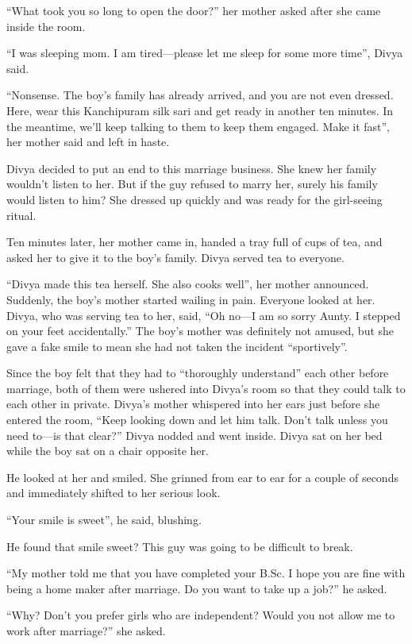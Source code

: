 “What took you so long to open the door?” her mother asked after she came inside
the room.

“I was sleeping mom. I am tired—please let me sleep for some more time”, Divya
said.

“Nonsense. The boy's family has already arrived, and you are not even dressed. Here,
wear this Kanchipuram silk sari and get ready in another ten minutes. In the
meantime, we'll keep talking to them to keep them engaged. Make it fast”, her
mother said and left in haste.

Divya decided to put an end to this marriage business. She knew her family
wouldn't listen to her. But if the guy refused to marry her, surely his family
would listen to him? She dressed up quickly and was ready for the girl-seeing
ritual.

Ten minutes later, her mother came in, handed a tray full of cups of tea, and
asked her to give it to the boy's family. Divya served tea to everyone.

“Divya made this tea herself. She also cooks well”, her mother announced.
Suddenly, the boy's mother started wailing in pain. Everyone looked at her.
Divya, who was serving tea to her, said, “Oh no—I am so sorry Aunty. I stepped
on your feet accidentally.” The boy's mother was definitely not amused, but she
gave a fake smile to mean she had not taken the incident “sportively”.

Since the boy felt that they had to “thoroughly understand” each other before
marriage, both of them were ushered into Divya's room so that they could talk to
each other in private. Divya's mother whispered into her ears just before she
entered the room, “Keep looking down and let him talk. Don't talk unless you
need to—is that clear?” Divya nodded and went inside. Divya sat on her bed
while the boy sat on a chair opposite her.

He looked at her and smiled. She grinned from ear to ear for a couple of seconds
and immediately shifted to her serious look.

“Your smile is sweet”, he said, blushing.

He found that smile sweet? This guy was going to be difficult to break.

“My mother told me that you have completed your B.Sc. I hope you are fine with
being a home maker after marriage. Do you want to take up a job?” he asked.

“Why? Don't you prefer girls who are independent? Would you not allow me to work
after marriage?” she asked.

